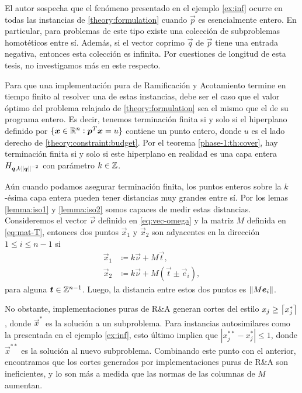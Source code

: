 El autor sospecha que el fenómeno presentado en el ejemplo \ref{ex:inf} ocurre en todas las
instancias de \eqref{theory:formulation} cuando $\vec{p}$ es esencialmente entero. En particular,
para problemas de este tipo existe una colección de subproblemas homotéticos entre sí. Además, si el
vector coprimo $\vec{q}$ de $\vec{p}$ tiene una entrada negativa, entonces esta colección es
infinita. Por cuestiones de longitud de esta tesis, no investigamos más en este respecto.

Para que una implementación pura de Ramificación y Acotamiento termine en tiempo finito al resolver
una de estas instancias, debe ser el caso que el valor óptimo del problema relajado de
\eqref{theory:formulation} sea el mismo que el de su programa entero. Es decir, tenemos terminación
finita si y solo si el hiperplano definido por
	$\lbrace \boldsymbol{x} \in \mathbb{R}^n \vcentcolon \boldsymbol{p}^T\boldsymbol{x} = u \rbrace$
contiene un punto entero, donde $u$ es el lado derecho de \eqref{theory:constraint:budget}. Por el
teorema \ref{phase-1:th:cover}, hay terminación finita si y solo si este hiperplano en realidad es
una capa entera $H_{\boldsymbol{q}, k\left\lVert \boldsymbol{q} \right\rVert^{-2}}$ con parámetro $k \in \mathbb{Z}$.

Aún cuando podamos asegurar terminación finita, los puntos enteros sobre la $k$-ésima capa entera
pueden tener distancias muy grandes entre sí. Por los lemas \ref{lemma:iso1} y \ref{lemma:iso2}
somos capaces de medir estas distancias. Consideremos el vector $\vec{\nu}$ definido en
\eqref{eq:vec-omega} y la matriz $M$ definida en \eqref{eq:mat-T}, entonces dos puntos $\vec{x}_1$ y
$\vec{x}_2$ son adyacentes en la dirección $1 \leq i \leq n - 1$ si
\begin{align*}
	\vec{x}_1 &\coloneq k\vec{\nu} + M\vec{t}, \\
	\vec{x}_2 &\coloneq k\vec{\nu} + M(\vec{t} \pm \vec{e}_i),
\end{align*}
para alguna $\boldsymbol{t} \in \mathbb{Z}^{n-1}$. Luego, la distancia entre estos dos puntos es
$\left\lVert M\boldsymbol{e}_i \right\rVert$.

No obstante, implementaciones puras de R\&A generan cortes del estilo $x_j \geq \left\lceil x_j^* \right\rceil$, donde
$\vec{x}^*$ es la solución a un subproblema. Para instancias autosimilares como la presentada en el
ejemplo \ref{ex:inf}, esto último implica que $|x_j^{**} - x_j^*| \leq 1$, donde $\vec{x}^{**}$ es
la solución al nuevo subproblema. Combinando este punto con el anterior, encontramos que los cortes
generados por implementaciones puras de R\&A son ineficientes, y lo son más a medida que las normas
de las columnas de $M$ aumentan.

